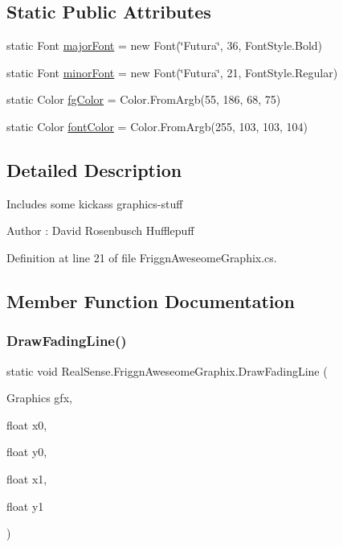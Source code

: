 \subsection*{Static Public Attributes}
\begin{DoxyCompactItemize}
\item 
static Font \hyperlink{class_real_sense_1_1_friggn_aweseome_graphix_ad34adf2179722fa8080e9f4032bc43ce}{major\+Font} = new Font(\char`\"{}Futura\char`\"{}, 36, Font\+Style.\+Bold)
\item 
static Font \hyperlink{class_real_sense_1_1_friggn_aweseome_graphix_a9d2afacf158345fcecf1b25b895806a2}{minor\+Font} = new Font(\char`\"{}Futura\char`\"{}, 21, Font\+Style.\+Regular)
\item 
static Color \hyperlink{class_real_sense_1_1_friggn_aweseome_graphix_a167341ae00dc0a13928b8b26de77e277}{fg\+Color} = Color.\+From\+Argb(55, 186, 68, 75)
\item 
static Color \hyperlink{class_real_sense_1_1_friggn_aweseome_graphix_a80a40fcc2a193f1d3a2a7ba3d9d4eb2b}{font\+Color} = Color.\+From\+Argb(255, 103, 103, 104)
\end{DoxyCompactItemize}


\subsection{Detailed Description}
Includes some kickass graphics-\/stuff \begin{DoxyAuthor}{Author}
\+: David Rosenbusch  Hufflepuff 
\end{DoxyAuthor}


Definition at line 21 of file Friggn\+Aweseome\+Graphix.\+cs.



\subsection{Member Function Documentation}
\mbox{\label{class_real_sense_1_1_friggn_aweseome_graphix_a213322f957a49429ac2a3017abdf49aa}} 
\subsubsection{\texorpdfstring{Draw\+Fading\+Line()}{DrawFadingLine()}}
{\footnotesize\ttfamily static void Real\+Sense.\+Friggn\+Aweseome\+Graphix.\+Draw\+Fading\+Line (\begin{DoxyParamCaption}\item[{Graphics}]{gfx,  }\item[{float}]{x0,  }\item[{float}]{y0,  }\item[{float}]{x1,  }\item[{float}]{y1 }\end{DoxyParamCaption})\hspace{0.3cm}{\ttfamily [static]}}

